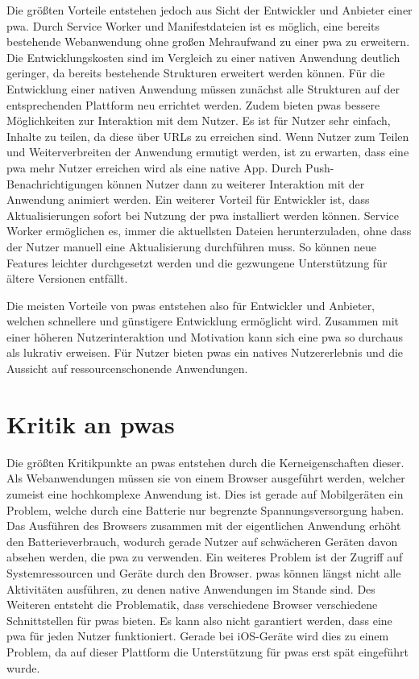\documentclass[12pt, parskip=half]{scrartcl}       %
\begin{document}
Die größten Vorteile entstehen jedoch aus Sicht der Entwickler und Anbieter einer \ac{pwa}.
Durch Service Worker und Manifestdateien ist es möglich, eine bereits bestehende Webanwendung ohne großen Mehraufwand zu einer \ac{pwa} zu erweitern.
Die Entwicklungskosten sind im Vergleich zu einer nativen Anwendung deutlich geringer, da bereits bestehende Strukturen erweitert werden können.
Für die Entwicklung einer nativen Anwendung müssen zunächst alle Strukturen auf der entsprechenden Plattform neu errichtet werden.
Zudem bieten \acp{pwa} bessere Möglichkeiten zur Interaktion mit dem Nutzer.
Es ist für Nutzer sehr einfach, Inhalte zu teilen, da diese über URLs zu erreichen sind.
Wenn Nutzer zum Teilen und Weiterverbreiten der Anwendung ermutigt werden, ist zu erwarten, dass eine \ac{pwa} mehr Nutzer erreichen wird als eine native App.
Durch Push-Benachrichtigungen können Nutzer dann zu weiterer Interaktion mit der Anwendung animiert werden.
Ein weiterer Vorteil für Entwickler ist, dass Aktualisierungen sofort bei Nutzung der \ac{pwa} installiert werden können.
Service Worker ermöglichen es, immer die aktuellsten Dateien herunterzuladen, ohne dass der Nutzer manuell eine Aktualisierung durchführen muss.
So können neue Features leichter durchgesetzt werden und die gezwungene Unterstützung für ältere Versionen entfällt.

Die meisten Vorteile von \acp{pwa} entstehen also für Entwickler und Anbieter, welchen schnellere und günstigere Entwicklung ermöglicht wird.
Zusammen mit einer höheren Nutzerinteraktion und Motivation kann sich eine \ac{pwa} so durchaus als lukrativ erweisen.
Für Nutzer bieten \acp{pwa} ein natives Nutzererlebnis und die Aussicht auf ressourcenschonende Anwendungen.


\newpage

\section{Kritik an \aclp{pwa}}
\label{sec:nachteile}

Die größten Kritikpunkte an \acp{pwa} entstehen durch die Kerneigenschaften dieser.
Als Webanwendungen müssen sie von einem Browser ausgeführt werden, welcher zumeist eine hochkomplexe Anwendung ist.
Dies ist gerade auf Mobilgeräten ein Problem, welche durch eine Batterie nur begrenzte Spannungsversorgung haben.
Das Ausführen des Browsers zusammen mit der eigentlichen Anwendung erhöht den Batterieverbrauch, wodurch gerade Nutzer auf schwächeren Geräten davon absehen werden, die \ac{pwa} zu verwenden.
Ein weiteres Problem ist der Zugriff auf Systemressourcen und Geräte durch den Browser.
\acp{pwa} können längst nicht alle Aktivitäten ausführen, zu denen native Anwendungen im Stande sind.
Des Weiteren entsteht die Problematik, dass verschiedene Browser verschiedene Schnittstellen für \acp{pwa} bieten.
Es kann also nicht garantiert werden, dass eine \ac{pwa} für jeden Nutzer funktioniert.
Gerade bei iOS-Geräte wird dies zu einem Problem, da auf dieser Plattform die Unterstützung für \acp{pwa} erst spät eingeführt wurde.
\end{document}
